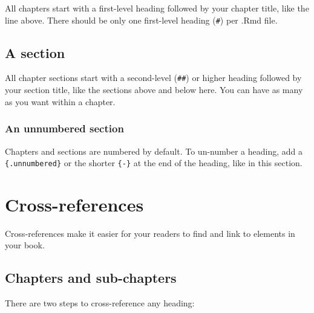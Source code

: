 \documentclass[
]{report}
\theoremstyle{definition}
\theoremstyle{definition}
\theoremstyle{definition}
\theoremstyle{definition}
\theoremstyle{remark}
\begin{document}
All chapters start with a first-level heading followed by your chapter title, like the line above. There should be only one first-level heading (\texttt{\#}) per .Rmd file.

\hypertarget{a-section}{%
\section{A section}\label{a-section}}

All chapter sections start with a second-level (\texttt{\#\#}) or higher heading followed by your section title, like the sections above and below here. You can have as many as you want within a chapter.

\hypertarget{an-unnumbered-section}{%
\subsection*{An unnumbered section}\label{an-unnumbered-section}}

Chapters and sections are numbered by default. To un-number a heading, add a \texttt{\{.unnumbered\}} or the shorter \texttt{\{-\}} at the end of the heading, like in this section.

\hypertarget{cross}{%
\chapter{Cross-references}\label{cross}}

Cross-references make it easier for your readers to find and link to elements in your book.

\hypertarget{chapters-and-sub-chapters}{%
\section{Chapters and sub-chapters}\label{chapters-and-sub-chapters}}

There are two steps to cross-reference any heading:
\end{document}
